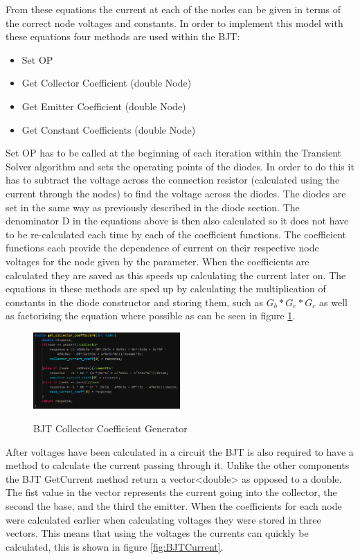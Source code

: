 \documentclass{article}
\begin{document}
From these equations the current at each of the nodes can be given in terms of the correct node voltages and constants. In order to implement this model with these equations four methods are used within the BJT:
\begin{itemize}
    \item Set OP
    \item Get Collector Coefficient (double Node)
    \item Get Emitter Coefficient (double Node)
    \item Get Constant Coefficients (double Node)
\end{itemize}
Set OP has to be called at the beginning of each iteration within the Transient Solver algorithm and sets the operating points of the diodes. In order to do this it has to subtract the voltage across the connection resistor (calculated using the current through the nodes) to find the voltage across the diodes. The diodes are set in the same way as previously described in the diode section. The denominator D in the equations above is then also calculated so it does not have to be re-calculated each time by each of the coefficient functions. The coefficient functions each provide the dependence of current on their respective node voltages for the node given by the parameter. When the coefficients are calculated they are saved as this speeds up calculating the current later on. The equations in these methods are sped up by calculating the multiplication of constants in the diode constructor and storing them, such as $G_b*G_e*G_c$ as well as factorising the equation where possible as can be seen in figure \ref{fig:BJTCollector}.    
\begin{figure}[h]
    \caption{BJT Collector Coefficient Generator}
    \centering
    \includegraphics[width=0.5\textwidth]{images/BJTCollector.png}
    \label{fig:BJTCollector}
\end{figure}
After voltages have been calculated in a circuit the BJT is also required to have a method to calculate the current passing through it. Unlike the other components the BJT GetCurrent method return a vector<double> as opposed to a double. The fist value in the vector represents the current going into the collector, the second the base, and the third the emitter. When the coefficients for each node were calculated earlier when calculating voltages they were stored in three vectors. This means that using the voltages the currents can quickly be calculated, this is shown in figure \ref{fig:BJTCurrent}. 
\end{document}
